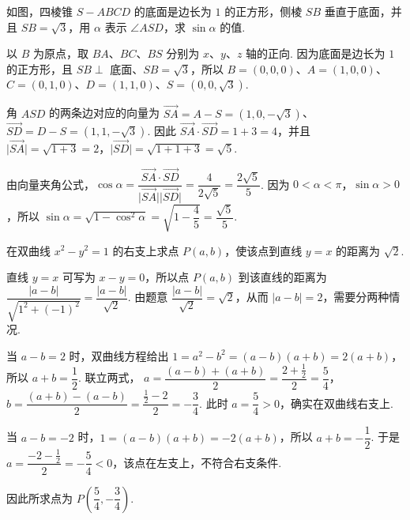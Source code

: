 \documentclass[UTF8,a4paper,oneside,11pt]{ctexbook}
\begin{document}
\begin{problem}
如图，四棱锥 \(S - ABCD\) 的底面是边长为 \(1\) 的正方形，侧棱 \(SB\) 垂直于底面，并且 \(SB = \sqrt{3}\)，用 \(\alpha\) 表示 \(\angle ASD\)，求 \(\sin\alpha\) 的值.

\end{problem}

\begin{solution}
以 \(B\) 为原点，取 \(BA\)、\(BC\)、\(BS\) 分别为 \(x\)、\(y\)、\(z\) 轴的正向. 因为底面是边长为 \(1\) 的正方形，且 \(SB\perp\) 底面、\(SB=\sqrt3\)，所以
\(B=(0,0,0)\)、\(A=(1,0,0)\)、\(C=(0,1,0)\)、\(D=(1,1,0)\)、\(S=(0,0,\sqrt3)\).

角 \(ASD\) 的两条边对应的向量为 \(\overrightarrow{SA}=A-S=(1,0,-\sqrt3)\)、\(\overrightarrow{SD}=D-S=(1,1,-\sqrt3)\). 因此
\(\overrightarrow{SA}\cdot\overrightarrow{SD}=1+3=4\)，并且 \(\lvert\overrightarrow{SA}\rvert=\sqrt{1+3}=2\)，\(\lvert\overrightarrow{SD}\rvert=\sqrt{1+1+3}=\sqrt5\).

由向量夹角公式，\(\cos\alpha=\dfrac{\overrightarrow{SA}\cdot\overrightarrow{SD}}{\lvert\overrightarrow{SA}\rvert\lvert\overrightarrow{SD}\rvert}=\dfrac4{2\sqrt5}=\dfrac{2\sqrt5}{5}\). 因为 \(0<\alpha<\pi\)，\(\sin\alpha>0\)，所以
\(\sin\alpha=\sqrt{1-\cos^2\alpha}=\sqrt{1-\dfrac45}=\dfrac{\sqrt5}{5}\).
\end{solution}

\begin{problem}
在双曲线 \(x^2 - y^2 = 1\) 的右支上求点 \(P(a,b)\)，使该点到直线 \(y = x\) 的距离为 \(\sqrt{2}\).
\end{problem}

\begin{solution}
直线 \(y=x\) 可写为 \(x-y=0\)，所以点 \(P(a,b)\) 到该直线的距离为 \(\dfrac{\lvert a-b\rvert}{\sqrt{1^2+(-1)^2}}=\dfrac{\lvert a-b\rvert}{\sqrt2}\). 由题意 \(\dfrac{\lvert a-b\rvert}{\sqrt2}=\sqrt2\)，从而 \(\lvert a-b\rvert=2\)，需要分两种情况.

当 \(a-b=2\) 时，双曲线方程给出 \(1=a^2-b^2=(a-b)(a+b)=2(a+b)\)，所以 \(a+b=\dfrac12\). 联立两式，
\(a=\dfrac{(a-b)+(a+b)}2=\dfrac{2+\frac12}{2}=\dfrac54\)，\(b=\dfrac{(a+b)-(a-b)}2=\dfrac{\frac12-2}{2}=-\dfrac34\). 此时 \(a=\dfrac54>0\)，确实在双曲线右支上.

当 \(a-b=-2\) 时，\(1=(a-b)(a+b)=-2(a+b)\)，所以 \(a+b=-\dfrac12\). 于是 \(a=\dfrac{-2-\frac12}{2}=-\dfrac54<0\)，该点在左支上，不符合右支条件.

因此所求点为 \(P\left(\dfrac54,-\dfrac34\right)\).
\end{solution}
\end{document}
